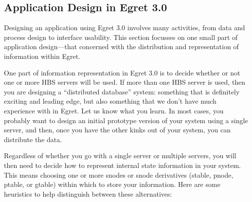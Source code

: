\subsection*{Application Design in Egret 3.0}

Designing an application using Egret 3.0 involves many activities, from 
data and process design to interface usability.  This section focusses on
one small part of application design---that concerned with the distribution
and representation of information within Egret. 

One part of information representation in Egret 3.0 is to decide whether or
not one or more HBS servers will be used.  If more than one HBS server is
used, then you are designing a ``distributed database'' system: something
that is definitely exciting and leading edge, but also something that we
don't have much experience with in Egret.  Let us know what you learn. In
most cases, you probably want to design an initial prototype version of
your system using a single server, and then, once you have the other kinks
out of your system, you can distribute the data.

Regardless of whether you go with a single server or multiple servers, you
will then need to decide how to represent internal state information in
your system.  This means choosing one or more snodes or snode derivatives
(stable, pnode, ptable, or gtable) within which to store your information.
Here are some heuristics to help distinguish between these alternatives:

